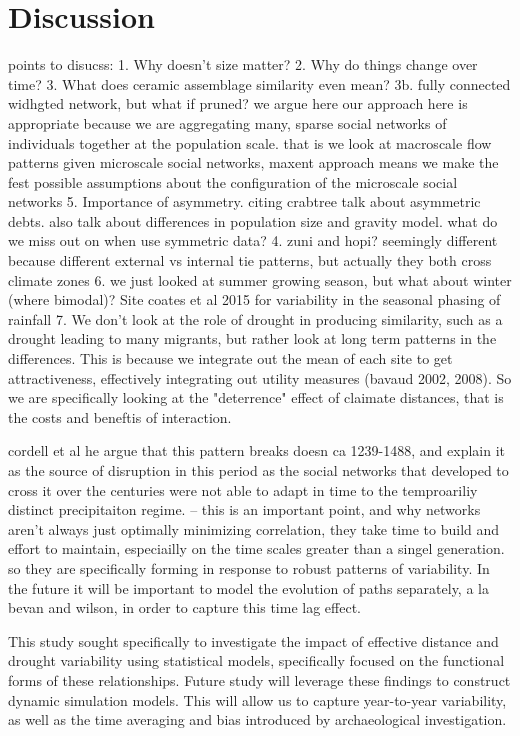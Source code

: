 \documentclass[fleqn,10pt]{wlscirep}
\begin{document}
\section*{Discussion}


points to disucss:
1. Why doesn't size matter?
2. Why do things change over time?
3. What does ceramic assemblage similarity even mean?
3b. fully connected widhgted network, but what if pruned?
  we argue here our approach here is appropriate because we are aggregating many, sparse social networks of individuals together at the population scale. that is we look at macroscale flow patterns given microscale social networks, maxent approach means we make the fest possible assumptions about the configuration of the microscale social networks
5. Importance of asymmetry. citing crabtree talk about asymmetric debts. also talk about differences in population size and gravity model. what do we miss out on when use symmetric data?
4. zuni and hopi? seemingly different because different external vs internal tie patterns, but actually they both cross climate zones
6. we just looked at summer growing season, but what about winter (where bimodal)? Site coates et al 2015 for variability in the seasonal phasing of rainfall
7. We don't look at the role of drought in producing similarity, such as a drought leading to many migrants, but rather look at long term patterns in the differences. This is because we integrate out the mean of each site to get attractiveness, effectively integrating out utility measures (bavaud 2002, 2008). So we are specifically looking at the "deterrence" effect of claimate distances, that is the costs and beneftis of interaction.

cordell et al he argue that this pattern breaks doesn ca 1239-1488, and explain it as the source of disruption in this period as the social networks that developed to cross it over the centuries were not able to adapt in time to the temproariliy distinct precipitaiton regime. -- this is an important point, and why networks aren't always just optimally minimizing correlation, they take time to build and effort to maintain, especiailly on the time scales greater than a singel generation. so they are specifically forming in response to robust patterns of variability. In the future it will be important to model the evolution of paths separately, a la bevan and wilson, in order to capture this time lag effect.

This study sought specifically to investigate the impact of effective distance and drought variability using statistical models, specifically focused on the functional forms of these relationships. Future study will leverage these findings to construct dynamic simulation models. This will allow us to capture year-to-year variability, as well as the time averaging and bias introduced by archaeological investigation.
\end{document}
